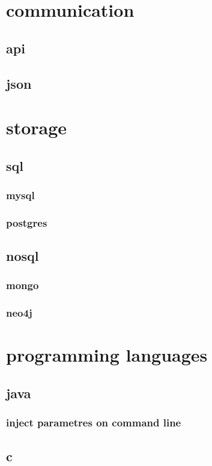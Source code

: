 \documentclass{report}
\begin{document}
\chapter{communication}
\section{api}
\section{json}

\chapter{storage}
\section{sql}
\subsection{mysql}
\subsection{postgres}

\section{nosql}
\subsection{mongo}
\subsection{neo4j}

\chapter{programming languages}
\section{java}
\subsection{inject parametres on command line}

\section{c}
\end{document}
